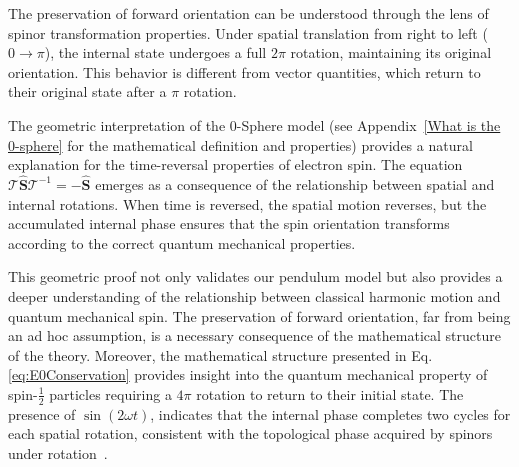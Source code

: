 \documentclass[%
 reprint,
 amsmath,amssymb,
 aps,
]{revtex4-1}
\numberwithin{equation}{section}%
\begin{document}
The preservation of forward orientation can be understood through the lens of spinor transformation properties. Under spatial translation from right to left (\( 0 \rightarrow \pi \)), the internal state undergoes a full \( 2\pi \) rotation, maintaining its original orientation. This behavior is different from vector quantities, which return to their original state after a \( \pi \) rotation.

The geometric interpretation of the 0-Sphere model (see Appendix~\ref{What is the 0-sphere} for the mathematical definition and properties) provides a natural explanation for the time-reversal properties of electron spin. The equation \( \mathcal{T}\hat{\boldsymbol{S}}\mathcal{T}^{-1} = -\hat{\boldsymbol{S}} \) emerges as a consequence of the relationship between spatial and internal rotations. When time is reversed, the spatial motion reverses, but the accumulated internal phase ensures that the spin orientation transforms according to the correct quantum mechanical properties.

This geometric proof not only validates our pendulum model but also provides a deeper understanding of the relationship between classical harmonic motion and quantum mechanical spin. The preservation of forward orientation, far from being an ad hoc assumption, is a necessary consequence of the mathematical structure of the theory. Moreover, the mathematical structure presented in Eq. \eqref{eq:E0Conservation} provides insight into the quantum mechanical property of spin-$\frac{1}{2}$ particles requiring a $4\pi$ rotation to return to their initial state. The presence of $\sin(2\omega t)$, indicates that the internal phase completes two cycles for each spatial rotation, consistent with the topological phase acquired by spinors under rotation~\cite{Uhlenbeck1925}.
\end{document}

